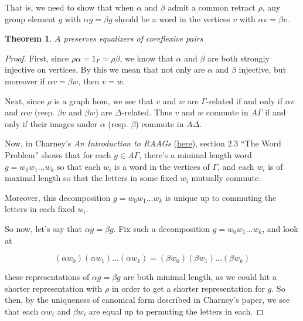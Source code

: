 \documentclass[12pt]{article}
\newtheorem{thm}{Theorem}
\theoremstyle{definition}
\theoremstyle{theorem}
\begin{document}
That is, we need to show that when 
$\alpha$ and $\beta$ admit a common retract $\rho$,
any group element $g$ with $\alpha g = \beta g$ should be a word in the
vertices $v$ with $\alpha v =  \beta v$.

\begin{thm}
    $A$ preserves equalizers of coreflexive pairs
\end{thm}


\begin{proof}
    First, since $\rho \alpha = 1_\Gamma = \rho \beta$, we know that $\alpha$ and
    $\beta$ are both strongly injective on vertices. By this we mean that not 
    only are $\alpha$ and $\beta$ injective, but moreover if
    $\alpha v = \beta w$, then $v = w$.

    Next, since $\rho$ is a graph
    hom, we see that $v$ and $w$ are $\Gamma$-related if and only if $\alpha v$
    and $\alpha w$ (resp. $\beta v$ and $\beta w$) are $\Delta$-related. Thus 
    $v$ and $w$ commute in $A \Gamma$ if and only if their images under $\alpha$
    (resp. $\beta$) commute in $A \Delta$.

    Now, in Charney's \emph{An Introduction to RAAGs} 
    (\href{https://people.brandeis.edu/~charney/papers/RAAGfinal.pdf}{here}),
    section $2.3$ ``The Word Problem'' shows that for each $g \in A\Gamma$,
    there's a minimal length word $g = w_0 w_1 \ldots w_k$ so that each 
    $w_i$ is a word in the vertices of $\Gamma$, and each $w_i$ is of maximal 
    length so that the letters in some fixed $w_i$ mutually commute.

    Moreover, this decomposition $g = w_0 w_1 \ldots w_k$ is unique up to 
    commuting the letters in each fixed $w_i$.

    So now, let's say that $\alpha g = \beta g$. Fix such a decomposition
    $g = w_0 w_1 \ldots w_k$, and look at 

    \[ (\alpha w_0) (\alpha w_1) \ldots (\alpha w_k) = (\beta w_0) (\beta w_1) \ldots (\beta w_k) \]

    these representations of $\alpha g = \beta g$ are both minimal length, as 
    we could hit a shorter representation with $\rho$ in order to get a 
    shorter representation for $g$. So then, by the uniqueness of canonical form 
    described in Charney's paper, 
    we see that each $\alpha w_i$ and $\beta w_i$ are equal up to permuting the 
    letters in each. 
    

\end{proof}
\end{document}
